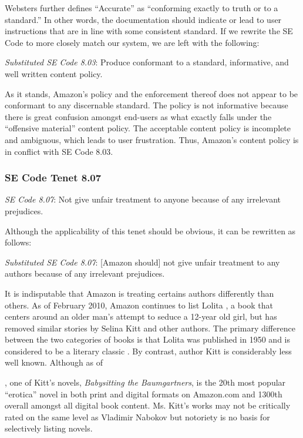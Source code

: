 \documentclass[11pt]{article}
\begin{document}
\begin{multicols}{2}
Websters further defines ``Accurate'' as ``conforming exactly to truth or to a standard.'' \cite{WebsterOnlineDict} In other words, the documentation should indicate or lead to user instructions that are in line with some consistent standard.  If we rewrite the SE Code to more closely match our system, we are left with the following:

\emph{Substituted SE Code 8.03}: Produce conformant to a standard, informative, and well written content policy.

As it stands, Amazon's policy and the enforcement thereof does not appear to be conformant to any discernable standard.  The policy is not informative because there is great confusion amongst end-users as what exactly falls under the ``offensive material'' content policy.  \cite{KittSelfPubRevolution, ShermanAmazonExecs}  The acceptable content policy is incomplete and ambiguous, which leads to user frustration.  Thus, Amazon's content policy is in conflict with SE Code 8.03.


\subsubsection{SE Code Tenet 8.07}

\emph{SE Code 8.07}: Not give unfair treatment to anyone because of any irrelevant prejudices.

Although the applicability of this tenet should be obvious, it can be rewritten as follows:

\emph{Substituted SE Code 8.07}: [Amazon should] not give unfair treatment to any authors because of any irrelevant prejudices.

It is indisputable that Amazon is treating certains authors differently than others.  As of February 2010, Amazon continues to list Lolita \cite{AmazonLolitaDTPListing}, a book that centers around an older man's attempt to seduce a 12-year old girl, but has removed similar stories by Selina Kitt and other authors. \cite{KittSelfPubRevolution}  The primary difference between the two categories of books is that Lolita was published in 1950 \cite{WikipediaLolita} and is considered to be a literary classic \cite{MLTop100}.  By contrast, author Kitt is considerably less well known. Although as of \date{February 24, 2011}, one of Kitt's novels, \emph{Babysitting the Baumgartners}, is the 20th most popular ``erotica'' novel in both print and digital formats on Amazon.com and 1300th overall amongst all digital book content. \cite{AmazonBabysittingListing} Ms. Kitt's works may not be critically rated on the same level as Vladimir Nabokov but notoriety is no basis for selectively listing novels.


\end{multicols}
\end{document}
